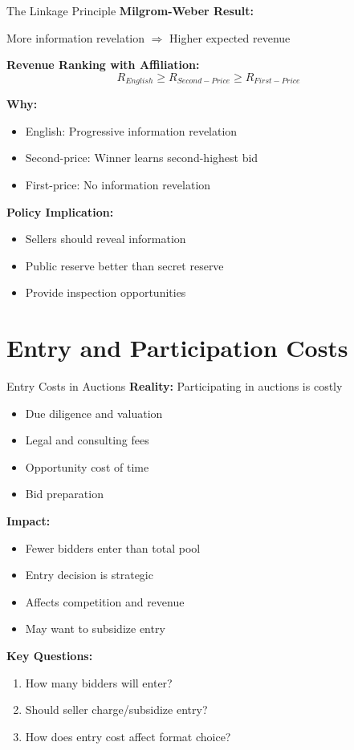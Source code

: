\documentclass[xcolor={x11names}, aspectratio=169 ]{beamer}
\begin{document}
\begin{frame}{The Linkage Principle}
\textbf{Milgrom-Weber Result:}

More information revelation $\Rightarrow$ Higher expected revenue

\textbf{Revenue Ranking with Affiliation:}
$$R_{English} \geq R_{Second-Price} \geq R_{First-Price}$$

\textbf{Why:}
\begin{itemize}
  \item English: Progressive information revelation
  \item Second-price: Winner learns second-highest bid
  \item First-price: No information revelation
\end{itemize}

\textbf{Policy Implication:}
\begin{itemize}
  \item Sellers should reveal information
  \item Public reserve better than secret reserve
  \item Provide inspection opportunities
\end{itemize}
\end{frame}

\section{Entry and Participation Costs}

\begin{frame}{Entry Costs in Auctions}
\textbf{Reality:} Participating in auctions is costly
\begin{itemize}
  \item Due diligence and valuation
  \item Legal and consulting fees
  \item Opportunity cost of time
  \item Bid preparation
\end{itemize}

\textbf{Impact:}
\begin{itemize}
  \item Fewer bidders enter than total pool
  \item Entry decision is strategic
  \item Affects competition and revenue
  \item May want to subsidize entry
\end{itemize}

\textbf{Key Questions:}
\begin{enumerate}
  \item How many bidders will enter?
  \item Should seller charge/subsidize entry?
  \item How does entry cost affect format choice?
\end{enumerate}
\end{frame}
\end{document}
